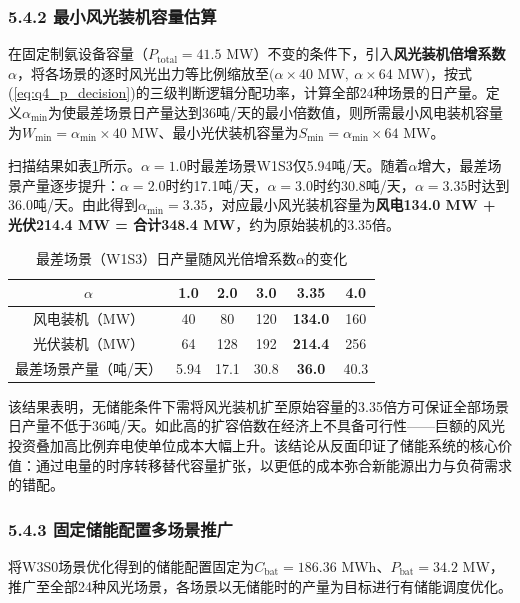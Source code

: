 \documentclass[zihao=-4,a4paper]{ctexart} %
\begin{document}
\subsubsection*{5.4.2 最小风光装机容量估算}

在固定制氨设备容量（$P_{\text{total}}=41.5$ MW）不变的条件下，引入\textbf{风光装机倍增系数}$\alpha$，将各场景的逐时风光出力等比例缩放至$(\alpha\times40$ MW$,\ \alpha\times64$ MW$)$，按式(\ref{eq:q4_p_decision})的三级判断逻辑分配功率，计算全部24种场景的日产量。定义$\alpha_{\min}$为使最差场景日产量达到36吨/天的最小倍数值，则所需最小风电装机容量为$W_{\min}=\alpha_{\min}\times40$ MW、最小光伏装机容量为$S_{\min}=\alpha_{\min}\times64$ MW。

扫描结果如表\ref{tab:q4_alpha_scan}所示。$\alpha=1.0$时最差场景W1S3仅5.94吨/天。随着$\alpha$增大，最差场景产量逐步提升：$\alpha=2.0$时约17.1吨/天，$\alpha=3.0$时约30.8吨/天，$\alpha=3.35$时达到36.0吨/天。由此得到$\alpha_{\min}=3.35$，对应最小风光装机容量为\textbf{风电134.0 MW + 光伏214.4 MW = 合计348.4 MW}，约为原始装机的3.35倍。

\begin{table}[H]
	\centering
	\small
	\caption{最差场景（W1S3）日产量随风光倍增系数$\alpha$的变化}
	\label{tab:q4_alpha_scan}
	\begin{tabular}{cccccc}
		\toprule
		$\alpha$ & 1.0 & 2.0 & 3.0 & \textbf{3.35} & 4.0 \\
		\midrule
		风电装机（MW） & 40 & 80 & 120 & \textbf{134.0} & 160 \\
		光伏装机（MW） & 64 & 128 & 192 & \textbf{214.4} & 256 \\
		最差场景产量（吨/天） & 5.94 & 17.1 & 30.8 & \textbf{36.0} & 40.3 \\
		\bottomrule
	\end{tabular}
\end{table}

该结果表明，无储能条件下需将风光装机扩至原始容量的3.35倍方可保证全部场景日产量不低于36吨/天。如此高的扩容倍数在经济上不具备可行性——巨额的风光投资叠加高比例弃电使单位成本大幅上升。该结论从反面印证了储能系统的核心价值：通过电量的时序转移替代容量扩张，以更低的成本弥合新能源出力与负荷需求的错配。
	
	\subsubsection*{5.4.3 固定储能配置多场景推广}
	
	将W3S0场景优化得到的储能配置固定为$C_{\text{bat}}=186.36$ MWh、$P_{\text{bat}}=34.2$ MW，推广至全部24种风光场景，各场景以无储能时的产量为目标进行有储能调度优化。
	
\end{document}
